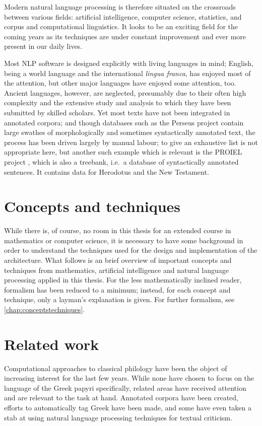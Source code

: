 Modern natural language processing is therefore situated on the
crossroads between various fields: artificial intelligence, computer
science, statistics, and corpus and computational linguistics. It
looks to be an exciting field for the coming years as its techniques
are under constant improvement and ever more present in our daily
lives.

Most NLP software is designed explicitly with living languages in
mind; English, being a world language and the international
\textit{lingua franca}, has enjoyed most of the attention, but other
major languages have enjoyed some attention, too. Ancient languages,
however, are neglected, presumably due to their often high complexity
and the extensive study and analysis to which they have been submitted
by skilled scholars. Yet most texts have not been integrated in
annotated corpora; and though databases such as the Perseus project
contain large swathes of morphologically and sometimes syntactically
annotated text, the process has been driven largely by manual labour;
to give an exhaustive list is not appropriate here, but another such
example which is relevant is the PROIEL project \citep{proiel}, which
is also a treebank, i.e.\ a database of syntactically annotated
sentences. It contains data for Herodotus and the New Testament.

\section{Concepts and techniques}
While there is, of course, no room in this thesis for an extended
course in mathematics or computer science, it is necessary to have
some background in order to understand the techniques used for the
design and implementation of the architecture. What follows is an
brief overview of important concepts and techniques from mathematics,
artificial intelligence and natural language processing applied in
this thesis. For the less mathematically inclined reader, formalism
has been reduced to a minimum; instead, for each concept and
technique, only a layman's explanation is given. For further
formalism, see \vref{chap:conceptstechniques}.

\section{Related work}
Computational approaches to classical philology have been the object
of increasing interest for the last few years. While none have chosen
to focus on the language of the Greek papyri specifically, related
areas have received attention and are relevant to the task at
hand. Annotated corpora have been created, efforts to automatically
tag Greek have been made, and some have even taken a stab at using
natural language processing techniques for textual criticism. 

